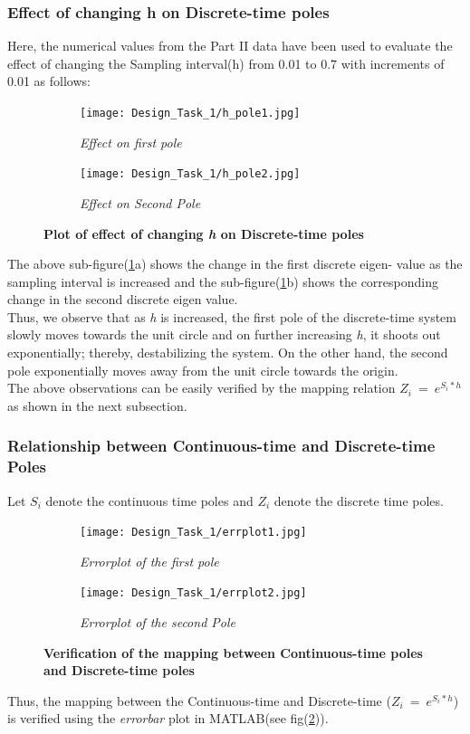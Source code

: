 \documentclass[a4paper,12pt]{article}
\begin{document}
		\subsubsection{Effect of changing h on Discrete-time poles}
		Here, the numerical values from the Part II data have been used to evaluate the effect of changing the Sampling interval(h) from 0.01 to 0.7 with increments of 0.01 as follows:
	\begin{figure}[H]
	\centering
	\begin{subfigure}[b]{0.5\textwidth}
	    \texttt{[image: Design\_Task\_1/h\_pole1.jpg]}
	    \caption{\textit{Effect on first pole}}
	    \end{subfigure}
	    \vspace{1em}
	    \begin{subfigure}[b]{0.5\textwidth}
	    \texttt{[image: Design\_Task\_1/h\_pole2.jpg]}
	    \caption{\textit{Effect on Second Pole}}
	    \end{subfigure}
	    \caption{\textbf{Plot of effect of changing \textit{h} on Discrete-time poles}}
	    \label{fig1}
	\end{figure}

The above sub-figure(\ref{fig1}a) shows the change in the first discrete eigen- value as the sampling interval is increased and the sub-figure(\ref{fig1}b) shows the corresponding change in the second discrete eigen value. \\
	Thus, we observe that as \textit{h} is increased, the first pole of the discrete-time system slowly moves towards the unit circle and on further increasing \textit{h}, it shoots out exponentially; thereby, destabilizing the system. 
	On the other hand, the second pole exponentially moves away from the unit circle towards the origin. \\
	The above observations can be easily verified by the mapping relation $Z_i \ = \ e^{S_i*h}$ as shown in the next subsection. 


	\subsubsection{Relationship between Continuous-time and Discrete-time Poles}	
	Let \textit{$S_i$} denote the continuous time poles and \textit{$Z_i$} denote the discrete time poles. \\
	\begin{figure}[H]
	\centering
	\begin{subfigure}[b]{0.5\textwidth}
	    \texttt{[image: Design\_Task\_1/errplot1.jpg]}
	    \caption{\textit{Errorplot of the first pole}}
	    \end{subfigure}
	    \vspace{1em}
	    \begin{subfigure}[b]{0.5\textwidth}
	    \texttt{[image: Design\_Task\_1/errplot2.jpg]}
	    \caption{\textit{Errorplot of the second Pole}}
	    \end{subfigure}
	    \caption{\textbf{Verification of the mapping between Continuous-time poles and Discrete-time poles}}
	    \label{fig2}
	\end{figure}
	Thus, the mapping between the Continuous-time and Discrete-time ($Z_i \ = \ e^{S_i*h}$) is verified using the \textit{errorbar} plot in MATLAB(see fig(\ref{fig2})).
\end{document}
